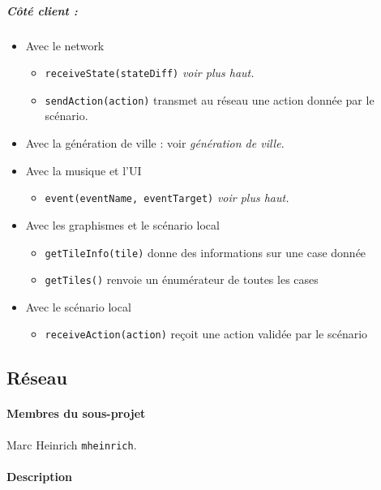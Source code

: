 \documentclass[a4paper,10pt]{article}
\begin{document}
\subparagraph{Côté client :}

\begin{itemize}
\item  Avec le network

  \begin{itemize}
  \item \verb!receiveState(stateDiff)! \emph{voir plus haut.}
  \item \verb!sendAction(action)! transmet au réseau une action donnée par le scénario.
  \end{itemize}

\item Avec la génération de ville : voir \emph{génération de ville}.

\item Avec la musique et l'UI

  \begin{itemize}
    \item \verb!event(eventName, eventTarget)! \emph{voir plus haut.}
  \end{itemize}

\item Avec les graphismes et le scénario local

  \begin{itemize}
  \item \verb!getTileInfo(tile)! donne des informations sur une case donnée
  \item \verb!getTiles()! renvoie un énumérateur de toutes les cases
  \end{itemize}

\item Avec le scénario local

  \begin{itemize}
  \item \verb!receiveAction(action)! reçoit une action validée par le scénario
  \end{itemize}

\end{itemize}


\subsection{Réseau}
\paragraph{Membres du sous-projet} Marc Heinrich \verb!mheinrich!.

\paragraph{Description}
\end{document}

